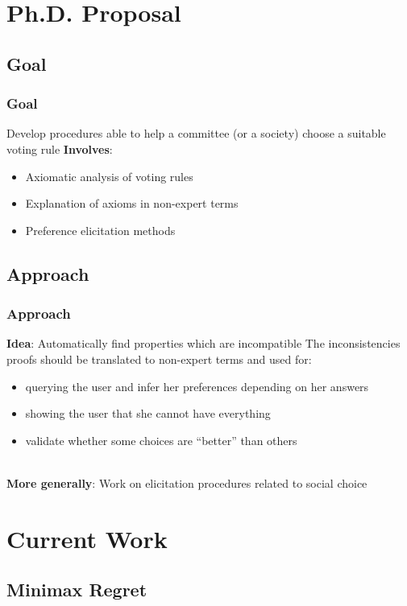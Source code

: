 \documentclass{beamer}
\begin{document}
\section{Ph.D. Proposal}
\subsection*{Goal}
\begin{frame}
\frametitle{Goal}
Develop procedures able to help a committee (or a society) choose a suitable voting rule
\newline \newline \textbf{Involves}:
\begin{itemize}
	\item Axiomatic analysis of voting rules
	\item Explanation of axioms in non-expert terms
	\item Preference elicitation methods
\end{itemize}
\end{frame}

\subsection*{Approach}
\begin{frame}
\frametitle{Approach}
	\textbf{Idea}: Automatically find properties which are incompatible  \newline \newline
	The inconsistencies proofs should be translated to non-expert terms and used for:
	\begin{itemize}
		\item querying the user and infer her preferences depending on her answers
		\item showing the user that she cannot have everything
		\item validate whether some choices are ``better'' than others
	\end{itemize}~\\	
	\textbf{More generally}: Work on elicitation procedures related to social choice
\end{frame}

\section{Current Work}
\subsection{Minimax Regret}
\end{document}
